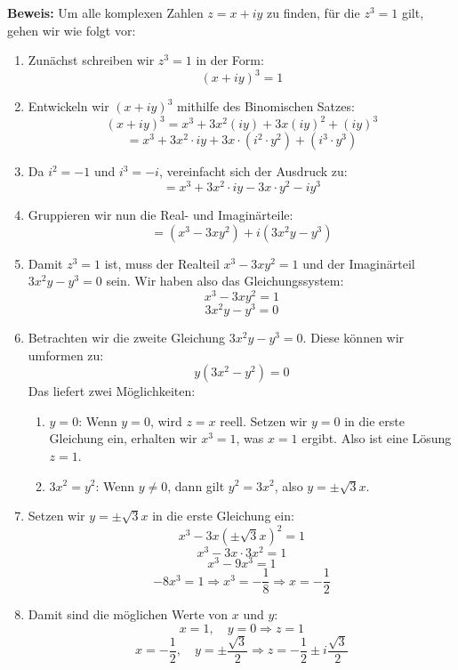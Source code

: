 \documentclass[11pt]{article}
\begin{document}
\textbf{Beweis:}
Um alle komplexen Zahlen \( z = x + iy \) zu finden, für die \( z^3 = 1 \) gilt, gehen wir wie folgt vor:
\begin{enumerate}
    \item Zunächst schreiben wir \( z^3 = 1 \) in der Form:
    \[
    (x + iy)^3 = 1
    \]
    \item Entwickeln wir \( (x + iy)^3 \) mithilfe des Binomischen Satzes:
    \[
    (x + iy)^3 = x^3 + 3x^2(iy) + 3x(iy)^2 + (iy)^3
    \]
    \[
    = x^3 + 3x^2 \cdot iy + 3x \cdot (i^2 \cdot y^2) + (i^3 \cdot y^3)
    \]
    \item Da \( i^2 = -1 \) und \( i^3 = -i \), vereinfacht sich der Ausdruck zu:
    \[
    = x^3 + 3x^2 \cdot iy - 3x \cdot y^2 - iy^3
    \]
    \item Gruppieren wir nun die Real- und Imaginärteile:
    \[
    = (x^3 - 3xy^2) + i(3x^2y - y^3)
    \]
    \item Damit \( z^3 = 1 \) ist, muss der Realteil \( x^3 - 3xy^2 = 1 \) und der Imaginärteil \( 3x^2y - y^3 = 0 \) sein. Wir haben also das Gleichungssystem:
    \[
    x^3 - 3xy^2 = 1
    \]
    \[
    3x^2y - y^3 = 0
    \]
    \item Betrachten wir die zweite Gleichung \( 3x^2y - y^3 = 0 \). Diese können wir umformen zu:
    \[
    y(3x^2 - y^2) = 0
    \]
    Das liefert zwei Möglichkeiten:
    \begin{enumerate}
        \item \( y = 0 \): Wenn \( y = 0 \), wird \( z = x \) reell. Setzen wir \( y = 0 \) in die erste Gleichung ein, erhalten wir \( x^3 = 1 \), was \( x = 1 \) ergibt. Also ist eine Lösung \( z = 1 \).
        \item \( 3x^2 = y^2 \): Wenn \( y \neq 0 \), dann gilt \( y^2 = 3x^2 \), also \( y = \pm \sqrt{3}x \).
    \end{enumerate}
    \item Setzen wir \( y = \pm \sqrt{3}x \) in die erste Gleichung ein:
    \[
    x^3 - 3x(\pm \sqrt{3}x)^2 = 1
    \]
    \[
    x^3 - 3x \cdot 3x^2 = 1
    \]
    \[
    x^3 - 9x^3 = 1
    \]
    \[
    -8x^3 = 1 \Rightarrow x^3 = -\frac{1}{8} \Rightarrow x = -\frac{1}{2}
    \]
    \item Damit sind die möglichen Werte von \( x \) und \( y \):
    \[
    x = 1, \quad y = 0 \Rightarrow z = 1
    \]
    \[
    x = -\frac{1}{2}, \quad y = \pm \frac{\sqrt{3}}{2} \Rightarrow z = -\frac{1}{2} \pm i\frac{\sqrt{3}}{2}
    \]
\end{enumerate}
\end{document}

